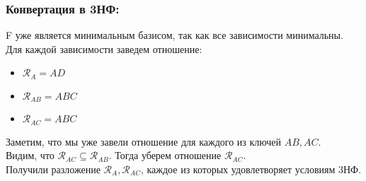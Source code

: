 \begin{solution}
    \subsubsection*{Конвертация в 3НФ:}
    F уже является минимальным базисом, так как все зависимости минимальны. \\
    Для каждой зависимости заведем отношение: 
    \begin{itemize}
        \item \( \mathcal{R}_A = AD \)
        \item \( \mathcal{R}_{AB} = ABC \)
        \item \( \mathcal{R}_{AC} = ABC \)
    \end{itemize}
    Заметим, что мы уже завели отношение для каждого из ключей \(AB, AC\). \\
    Видим, что \(\mathcal{R}_{AC} \subseteq \mathcal{R}_{AB}\). Тогда уберем отношение \( \mathcal{R}_{AC} \). \\
    Получили разложение \( \mathcal{R}_{A}, \mathcal{R}_{AC} \), каждое из которых удовлетворяет условиям 3НФ.
\end{solution}